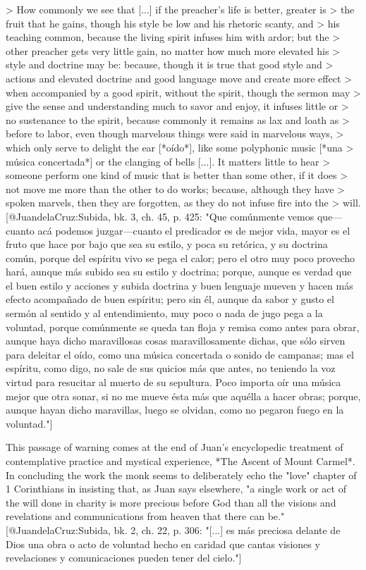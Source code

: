 > How commonly we see that [...] if the preacher's life is better, greater is
> the fruit that he gains, though his style be low and his rhetoric scanty, and
> his teaching common, because the living spirit infuses him with ardor; but the
> other preacher gets very little gain, no matter how much more elevated his
> style and doctrine may be: because, though it is true that good style and
> actions and elevated doctrine and good language move and create more effect
> when accompanied by a good spirit, without the spirit, though the sermon may
> give the sense and understanding much to savor and enjoy, it infuses little or
> no sustenance to the spirit, because commonly it remains as lax and loath as
> before to labor, even though marvelous things were said in marvelous ways,
> which only serve to delight the ear [*oído*], like some polyphonic music [*una
> música concertada*] or the clanging of bells [...]. It matters little to hear
> someone perform one kind of music that is better than some other, if it does
> not move me more than the other to do works; because, although they have
> spoken marvels, then they are forgotten, as they do not infuse fire into the
> will.
[@JuandelaCruz:Subida, bk. 3, ch. 45, p. 425: 
"Que comúnmente vemos que---cuanto acá podemos juzgar---cuanto el predicador es
de mejor vida, mayor es el fruto que hace por bajo que sea su estilo, y poca su
retórica, y su doctrina común, porque del espíritu vivo se pega el calor; pero
el otro muy poco provecho hará, aunque más subido sea su estilo y doctrina;
porque, aunque es verdad que el buen estilo y acciones y subida doctrina y buen
lenguaje mueven y hacen más efecto acompañado de buen espíritu; pero sin él,
aunque da sabor y gusto el sermón al sentido y al entendimiento, muy poco o nada
de jugo pega a la voluntad, porque comúnmente se queda tan floja y remisa como
antes para obrar, aunque haya dicho maravillosas cosas maravillosamente dichas,
que sólo sirven para deleitar el oído, como una música concertada o sonido de
campanas; mas el espíritu, como digo, no sale de sus quicios más que antes, no
teniendo la voz virtud para resucitar al muerto de su sepultura. 
Poco importa oír una música mejor que otra sonar, si no me mueve ésta más que
aquélla a hacer obras; porque, aunque hayan dicho maravillas, luego se olvidan,
como no pegaron fuego en la voluntad."]

This passage of warning comes at the end of Juan's encyclopedic treatment of
contemplative practice and mystical experience, *The Ascent of Mount Carmel*.
In concluding the work the monk seems to deliberately echo the "love" chapter of
1 Corinthians in insisting that, as Juan says elsewhere, "a single work or act
of the will done in charity is more precious before God than all the visions and
revelations and communications from heaven that there can be." 
[@JuandelaCruz:Subida, bk. 2, ch. 22, p. 306: 
"[...] es más preciosa delante de Dios una obra o acto de voluntad hecho en
caridad que cantas visiones y revelaciones y comunicaciones pueden tener del
cielo."]

